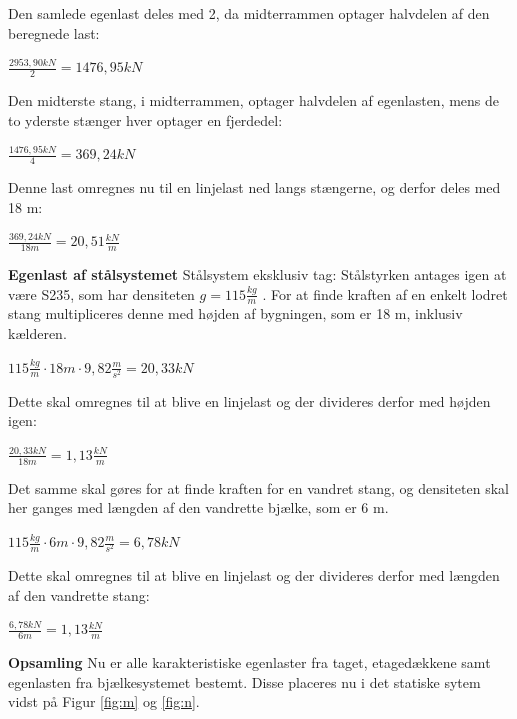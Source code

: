 Den samlede egenlast deles med 2, da midterrammen optager halvdelen af den beregnede last:
\begin{center}
	$\frac{2953,\!90 kN}{2} = 1476,\!95 kN$
\end{center}

Den midterste stang, i midterrammen, optager halvdelen af egenlasten, mens de to yderste stænger hver optager en fjerdedel:
\begin{center}
	$\frac{1476,\!95 kN}{4} = 369,\!24 kN$
\end{center}

Denne last omregnes nu til en linjelast ned langs stængerne, og derfor deles med 18 m:
\begin{center}
	$\frac{369,\!24 kN}{18 m} = 20,\!51 \frac{kN}{m}$
\end{center}

\textbf{Egenlast af stålsystemet}
\newline
\newline
Stålsystem eksklusiv tag:
\newline
Stålstyrken antages igen at være S235, som har densiteten $g=115\frac{kg}{m}$ \citep{stabi}. For at finde kraften af en enkelt lodret stang multipliceres denne med højden af bygningen, som er 18 m, inklusiv kælderen.
\begin{center}
	$115\frac{kg}{m}\cdot 18 m \cdot 9,\!82\frac{m}{s^2} = 20,\!33 kN$
\end{center}

Dette skal omregnes til at blive en linjelast og der divideres derfor med højden igen:

\begin{center}
	$\frac{20,\!33 kN}{18m} = 1,\!13\frac{kN}{m}$
\end{center}

Det samme skal gøres for at finde kraften for en vandret stang, og densiteten skal her ganges med længden af den vandrette bjælke, som er 6 m.
\begin{center}
	$115\frac{kg}{m}\cdot 6 m \cdot 9,\!82\frac{m}{s^2} = 6,\!78  kN$
\end{center}

Dette skal omregnes til at blive en linjelast og der divideres derfor med længden af den vandrette stang:
\begin{center}
$\frac{6,\!78 kN}{6m} = 1,\!13 \frac{kN}{m}$
\end{center}

\textbf{Opsamling}
\newline
Nu er alle karakteristiske egenlaster fra taget, etagedækkene samt egenlasten fra bjælkesystemet bestemt. Disse placeres nu i det statiske sytem vidst på Figur \ref{fig:m} og \ref{fig:n}.

